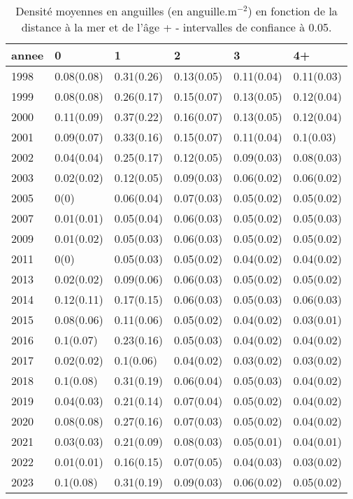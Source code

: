\begin{table}[htbp]
\centering
\caption[Densité âge et distance.]{Densité moyennes en anguilles (en anguille.m$^{-2}$) en fonction de la distance à la mer et de l'âge + - intervalles de confiance à 0.05.} 
\label{table_densite_age_annee}
\begin{tabular}{llllll}
  \hline
annee & 0 & 1 & 2 & 3 & 4+ \\ 
  \hline
1998 & 0.08(0.08) & 0.31(0.26) & 0.13(0.05) & 0.11(0.04) & 0.11(0.03) \\ 
  1999 & 0.08(0.08) & 0.26(0.17) & 0.15(0.07) & 0.13(0.05) & 0.12(0.04) \\ 
  2000 & 0.11(0.09) & 0.37(0.22) & 0.16(0.07) & 0.13(0.05) & 0.12(0.04) \\ 
  2001 & 0.09(0.07) & 0.33(0.16) & 0.15(0.07) & 0.11(0.04) & 0.1(0.03) \\ 
  2002 & 0.04(0.04) & 0.25(0.17) & 0.12(0.05) & 0.09(0.03) & 0.08(0.03) \\ 
  2003 & 0.02(0.02) & 0.12(0.05) & 0.09(0.03) & 0.06(0.02) & 0.06(0.02) \\ 
  2005 & 0(0) & 0.06(0.04) & 0.07(0.03) & 0.05(0.02) & 0.05(0.02) \\ 
  2007 & 0.01(0.01) & 0.05(0.04) & 0.06(0.03) & 0.05(0.02) & 0.05(0.03) \\ 
  2009 & 0.01(0.02) & 0.05(0.03) & 0.06(0.03) & 0.05(0.02) & 0.05(0.02) \\ 
  2011 & 0(0) & 0.05(0.03) & 0.05(0.02) & 0.04(0.02) & 0.04(0.02) \\ 
  2013 & 0.02(0.02) & 0.09(0.06) & 0.06(0.03) & 0.05(0.02) & 0.05(0.02) \\ 
  2014 & 0.12(0.11) & 0.17(0.15) & 0.06(0.03) & 0.05(0.03) & 0.06(0.03) \\ 
  2015 & 0.08(0.06) & 0.11(0.06) & 0.05(0.02) & 0.04(0.02) & 0.03(0.01) \\ 
  2016 & 0.1(0.07) & 0.23(0.16) & 0.05(0.03) & 0.04(0.02) & 0.04(0.02) \\ 
  2017 & 0.02(0.02) & 0.1(0.06) & 0.04(0.02) & 0.03(0.02) & 0.03(0.02) \\ 
  2018 & 0.1(0.08) & 0.31(0.19) & 0.06(0.04) & 0.05(0.03) & 0.04(0.02) \\ 
  2019 & 0.04(0.03) & 0.21(0.14) & 0.07(0.04) & 0.05(0.02) & 0.04(0.02) \\ 
  2020 & 0.08(0.08) & 0.27(0.16) & 0.07(0.03) & 0.05(0.02) & 0.04(0.02) \\ 
  2021 & 0.03(0.03) & 0.21(0.09) & 0.08(0.03) & 0.05(0.01) & 0.04(0.01) \\ 
  2022 & 0.01(0.01) & 0.16(0.15) & 0.07(0.05) & 0.04(0.03) & 0.03(0.02) \\ 
  2023 & 0.1(0.08) & 0.31(0.19) & 0.09(0.03) & 0.06(0.02) & 0.05(0.02) \\ 
   \hline
\end{tabular}
\end{table}
